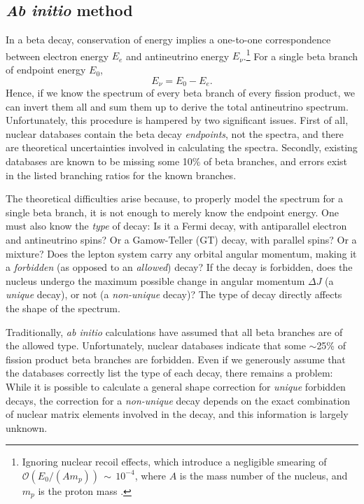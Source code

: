 \documentclass[../thesis.tex]{subfiles}
\begin{document}
\subsection{\textit{Ab initio} method}
\label{sec:abinitio}

In a beta decay, conservation of energy implies a one-to-one correspondence between electron energy $E_e$ and antineutrino energy $E_\nu$.\footnote{Ignoring nuclear recoil effects, which introduce a negligible smearing of $\mathcal{O}(E_0/(Am_p))\,\sim\,10^{-4}$, where $A$ is the mass number of the nucleus, and $m_p$ is the proton mass \cite{PhysRevC.84.024617}.} For a single beta branch of endpoint energy $E_0$,
\begin{equation}
  \label{eq:reacEnuEe}
  E_\nu = E_0 - E_e.
\end{equation}
Hence, if we know the spectrum of every beta branch of every fission product, we can invert them all and sum them up to derive the total antineutrino spectrum. Unfortunately, this procedure is hampered by two significant issues. First of all, nuclear databases contain the beta decay \emph{endpoints}, not the spectra, and there are theoretical uncertainties involved in calculating the spectra. Secondly, existing databases \cite{ENSDF,JENDL} are known to be missing some 10\% of beta branches, and errors exist in the listed branching ratios for the known branches.

The theoretical difficulties arise because, to properly model the spectrum for a single beta branch, it is not enough to merely know the endpoint energy. One must also know the \emph{type} of decay: Is it a Fermi decay, with antiparallel electron and antineutrino spins? Or a Gamow-Teller (GT) decay, with parallel spins? Or a mixture? Does the lepton system carry any orbital angular momentum, making it a \emph{forbidden} (as opposed to an \emph{allowed}) decay? If the decay is forbidden, does the nucleus undergo the maximum possible change in angular momentum $\Delta J$ (a \emph{unique} decay), or not (a \emph{non-unique} decay)? The type of decay directly affects the shape of the spectrum.

Traditionally, \emph{ab initio} calculations have assumed that all beta branches are of the allowed type. Unfortunately, nuclear databases indicate that some $\sim$25\% of fission product beta branches are forbidden. Even if we generously assume that the databases correctly list the type of each decay, there remains a problem: While it is possible to calculate a general shape correction for \emph{unique} forbidden decays, the correction for a \emph{non-unique} decay depends on the exact combination of nuclear matrix elements involved in the decay, and this information is largely unknown.
\end{document}
